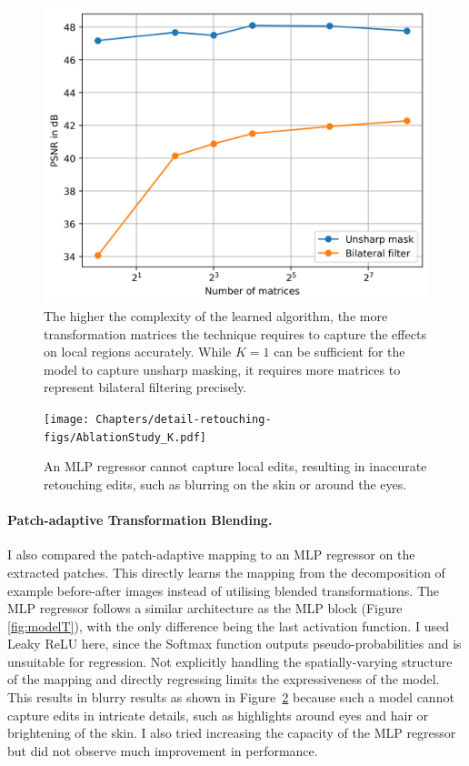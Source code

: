 \begin{figure}[th] %
    \centering
	\includegraphics[width=0.6\columnwidth]{Chapters/detail-retouching-figs/ablation_matrices.png}

    \caption{The higher the complexity of the learned algorithm, the more transformation matrices the technique requires to capture the effects on local regions accurately. While $K=1$ can be sufficient for the model to capture unsharp masking, it requires more matrices to represent bilateral filtering precisely.}

    \label{fig:ablation_K}
\end{figure}

\begin{figure}%
\centering
\texttt{[image: Chapters/detail-retouching-figs/AblationStudy\_K.pdf]}
    \caption{An MLP regressor cannot capture local edits, resulting in inaccurate retouching edits, such as blurring on the skin or around the eyes.}

\label{fig:ablation_MLP}
\end{figure}
\paragraph{Patch-adaptive Transformation Blending.} I also compared the patch-adaptive mapping to an MLP regressor on the extracted patches. This directly learns the mapping from the decomposition of example before-after images instead of utilising blended transformations. The MLP regressor follows a similar architecture as the MLP block (Figure \ref{fig:modelT}), with the only difference being the last activation function. I used Leaky ReLU here, since the Softmax function outputs pseudo-probabilities and is unsuitable for regression. Not explicitly handling the spatially-varying structure of the mapping and directly regressing limits the expressiveness of the model. This results in blurry results as shown in Figure~\ref{fig:ablation_MLP} because such a model cannot capture edits in intricate details, such as highlights around eyes and hair or brightening of the skin. I also tried increasing the capacity of the MLP regressor but did not observe much improvement in performance.


